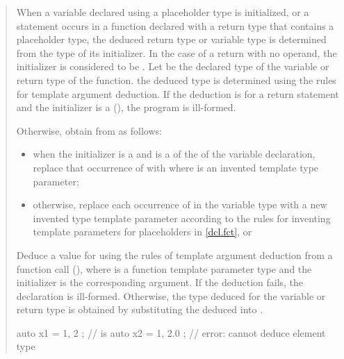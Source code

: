 \begin{quote}
\pnum
When a variable declared using a placeholder type is initialized, or a 
 statement occurs in a function declared with a return type 
that contains a placeholder type, the deduced return type or variable type 
is determined from the type of its initializer.
%
In the case of a return with no operand, the initializer is considered to 
be .
%
Let  be the declared type of the variable or return type of the 
function.
%
the deduced type is determined using the rules for template argument
deduction. 
%
If the deduction is for a return statement and the initializer is a 
 (), the program is
ill-formed. 
%

\begin{addedblock}
Otherwise, obtain  from  as follows:
\begin{itemize}
\item when the initializer is a 
and  is a  of the 
 of the variable declaration, replace that 
occurrence of  with 
where  is an invented template type parameter;

\item otherwise, replace each occurrence of  in the
variable type with a new invented type template parameter
according to the rules for inventing template parameters
for placeholders in \ref{dcl.fct}, or
\end{itemize}
\end{addedblock}
% 
Deduce a value for   using the rules of template argument deduction from 
a function call (), where  is a function 
template parameter type and the initializer is the corresponding argument.
%
If the deduction fails, the declaration is ill-formed. 
% 
Otherwise, the type deduced for the variable or return type is obtained by 
substituting the deduced   into .
% 
\enterexample
\begin{codeblock}
auto x1 = { 1, 2 };                 //   is 
auto x2 = { 1, 2.0 };               // error: cannot deduce element type
\end{codeblock}
\exitexample
\end{quote}

